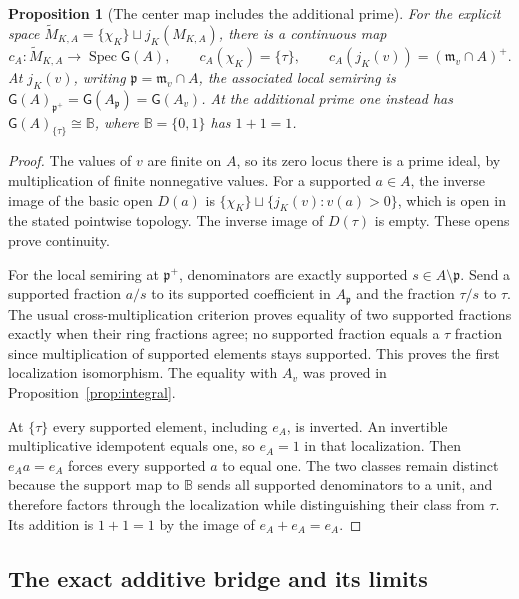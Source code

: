 \documentclass[11pt,a4paper]{article}
\newtheorem{proposition}[theorem]{Proposition}
\theoremstyle{definition}\newtheorem{definition}[theorem]{Definition}
\newcommand{\Spec}{\operatorname{Spec}}\newcommand{\SpecMon}{\operatorname{Spec}_{\mathrm{mon}}}
\newcommand{\G}{\mathsf G}\newcommand{\Tor}{\operatorname{Tor}}\newcommand{\Frac}{\operatorname{Frac}}
\begin{document}
\begin{proposition}[The center map includes the additional prime]
\label{prop:centermap}
For the explicit space
$\widetilde M_{K,A}=\{\chi_K\}\sqcup j_K(M_{K,A})$, there is a
continuous map
\[
 c_A:\widetilde M_{K,A}\longrightarrow\Spec\G(A),\qquad
 c_A(\chi_K)=\{\tau\},\qquad
 c_A(j_K(v))=(\mathfrak m_v\cap A)^+.
 \tag{AV4.3}\label{eq:center-map}
\]
At $j_K(v)$, writing $\mathfrak p=\mathfrak m_v\cap A$, the associated
local semiring is $\G(A)_{\mathfrak p^+}=\G(A_{\mathfrak p})=\G(A_v)$.
At the additional prime one instead has
$\G(A)_{\{\tau\}}\cong\mathbb B$, where
$\mathbb B=\{0,1\}$ has $1+1=1$.
\end{proposition}
\begin{proof}
The values of $v$ are finite on $A$, so its zero locus there is a prime
ideal, by multiplication of finite nonnegative values. For a supported
$a\in A$, the inverse image of the basic open $D(a)$ is
$\{\chi_K\}\sqcup\{j_K(v):v(a)>0\}$, which is open in the stated
pointwise topology. The inverse image of $D(\tau)$ is empty. These
opens prove continuity.

For the local semiring at $\mathfrak p^+$, denominators are exactly
supported $s\in A\setminus\mathfrak p$. Send a supported fraction
$a/s$ to its supported coefficient in $A_{\mathfrak p}$ and the
fraction $\tau/s$ to $\tau$. The usual cross-multiplication criterion
proves equality of two supported fractions exactly when their ring
fractions agree; no supported fraction equals a $\tau$ fraction since
multiplication of supported elements stays supported. This proves the
first localization isomorphism. The equality with $A_v$ was proved in
Proposition~\ref{prop:integral}.

At $\{\tau\}$ every supported element, including $e_A$, is inverted.
An invertible multiplicative idempotent equals one, so $e_A=1$ in that
localization. Then $e_Aa=e_A$ forces every supported $a$ to equal one.
The two classes remain distinct because the support map to $\mathbb B$
sends all supported denominators to a unit, and therefore factors
through the localization while distinguishing their class from $\tau$.
Its addition is $1+1=1$ by the image of $e_A+e_A=e_A$.
\end{proof}

\subsection{The exact additive bridge and its limits}
\end{document}
